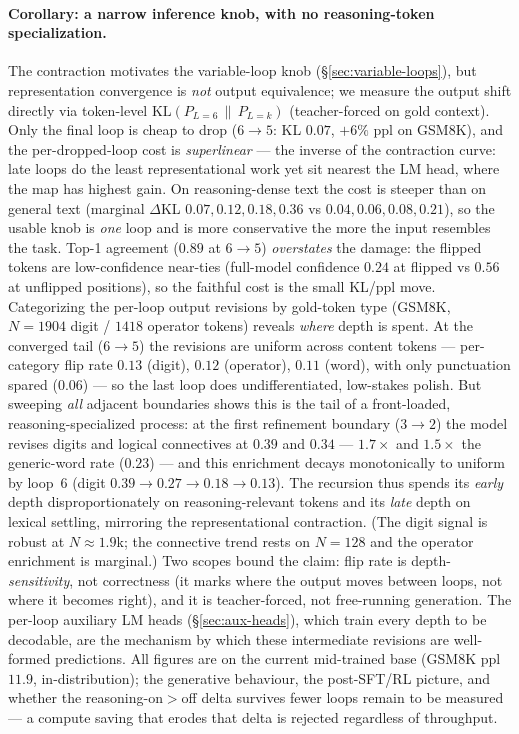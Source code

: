 \documentclass[11pt,twocolumn]{article}
\begin{document}
\paragraph{Corollary: a narrow inference knob, with no reasoning-token
specialization.} The contraction motivates the variable-loop knob
(\S\ref{sec:variable-loops}), but representation convergence is \emph{not}
output equivalence; we measure the output shift directly via token-level
$\mathrm{KL}\!\left(P_{L=6}\,\|\,P_{L=k}\right)$ (teacher-forced on gold context).
Only the final loop is cheap to drop ($6\!\to\!5$: KL $0.07$, $+6\%$ ppl on
GSM8K), and the per-dropped-loop cost is \emph{superlinear} --- the inverse of
the contraction curve: late loops do the least representational work yet sit
nearest the LM head, where the map has highest gain. On reasoning-dense text the
cost is steeper than on general text (marginal $\Delta$KL
$0.07,0.12,0.18,0.36$ vs $0.04,0.06,0.08,0.21$), so the usable knob is
\emph{one} loop and is more conservative the more the input resembles the task.
Top-1 agreement ($0.89$ at $6\!\to\!5$) \emph{overstates} the damage: the flipped
tokens are low-confidence near-ties (full-model confidence $0.24$ at flipped vs
$0.56$ at unflipped positions), so the faithful cost is the small KL/ppl move.
Categorizing the per-loop output revisions by gold-token type (GSM8K,
$N\!=\!1904$ digit / $1418$ operator tokens) reveals \emph{where} depth is spent.
At the converged tail ($6\!\to\!5$) the revisions are uniform across content
tokens --- per-category flip rate $0.13$ (digit), $0.12$ (operator), $0.11$
(word), with only punctuation spared ($0.06$) --- so the last loop does
undifferentiated, low-stakes polish. But sweeping \emph{all} adjacent boundaries
shows this is the tail of a front-loaded, reasoning-specialized process: at the
first refinement boundary ($3\!\to\!2$) the model revises digits and logical
connectives at $0.39$ and $0.34$ --- $1.7\times$ and $1.5\times$ the generic-word
rate ($0.23$) --- and this enrichment decays monotonically to uniform by loop~6
(digit $0.39\!\to\!0.27\!\to\!0.18\!\to\!0.13$). The recursion thus spends its
\emph{early} depth disproportionately on reasoning-relevant tokens and its
\emph{late} depth on lexical settling, mirroring the representational
contraction. (The digit signal is robust at $N\!\approx\!1.9$k; the connective
trend rests on $N\!=\!128$ and the operator enrichment is marginal.) Two scopes
bound the claim: flip rate is depth-\emph{sensitivity}, not correctness (it marks
where the output moves between loops, not where it becomes right), and it is
teacher-forced, not free-running generation. The per-loop auxiliary LM heads
(\S\ref{sec:aux-heads}), which train every depth to be decodable, are the
mechanism by which these intermediate revisions are well-formed predictions.
All figures are on the current mid-trained base (GSM8K ppl $11.9$,
in-distribution); the generative behaviour, the post-SFT/RL picture, and whether
the reasoning-on$>$off delta survives fewer loops remain to be measured --- a
compute saving that erodes that delta is rejected regardless of throughput.
\end{document}
